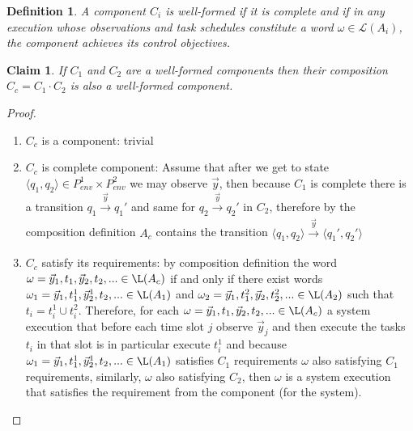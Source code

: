 \documentclass[ twoside, 12pt ]{article}
\newtheorem{dfn}{Definition} %
\newtheorem{claim}[thm]{Claim}
\begin{document}
\begin{dfn}
    A component $C_i$ is well-formed if it is complete and if in  any execution whose observations and task schedules constitute a word $\omega \in \mathcal{L}(A_i)$, the component achieves its control objectives.
\end{dfn}

\begin{claim}
    \label{thm:valid_composition}
    If $C_1$ and $C_2$ are a well-formed components then their composition $C_c=C_1 \cdot C_2$ is also a well-formed component.
\end{claim}
\begin{proof}
    \begin{enumerate}
        \item $C_c$ is a component: trivial 
        
        \item $C_c$ is complete component: Assume that after we get to state $\langle q_1 , q_2 \rangle \in P_{env}^1 \times P_{env}^2$ we may observe $\vec{y}$, then because $C_1$ is complete there is a transition $q_1 \xrightarrow[]{\vec{y}} q_1'$ and same for $q_2 \xrightarrow[]{\vec{y}} q_2'$ in $C_2$, therefore by the composition definition $A_c$ contains the transition $\langle q_1 , q_2 \rangle \xrightarrow[]{\vec{y}} \langle q_1' , q_2' \rangle$
        
        \item $C_c$ satisfy its requirements: by composition definition the word $\omega= \vec{y}_1 , t_1 , \vec{y}_2 , t_2, ... \in \L(A_c)$ if and only if there exist words $\omega_1= \vec{y}_1 , t_1^1 , \vec{y}_2^1 , t_2, ... \in \L(A_1)$ and $\omega_2= \vec{y}_1 , t_1^2 , \vec{y}_2 , t_2^2, ... \in \L(A_2)$ such that $t_i = t_i^1 \cup t_i^2$. 
        Therefore, for each $\omega = \vec{y}_1 , t_1 , \vec{y}_2 , t_2, ... \in \L(A_c)$ a system execution that before each time slot $j$ observe $\vec{y}_j$ and then execute the tasks $t_i$ in that slot is in particular execute $t_i^1$ and because $\omega_1= \vec{y}_1 , t_1^1 , \vec{y}_2^1 , t_2, ... \in \L(A_1)$ satisfies $C_1$ requirements $\omega$ also satisfying $C_1$ requirements, similarly, $\omega$ also satisfying $C_2$, then $\omega$ is a system execution that satisfies the requirement from the component (for the system).
        
    \end{enumerate}
\end{proof}
\end{document}
